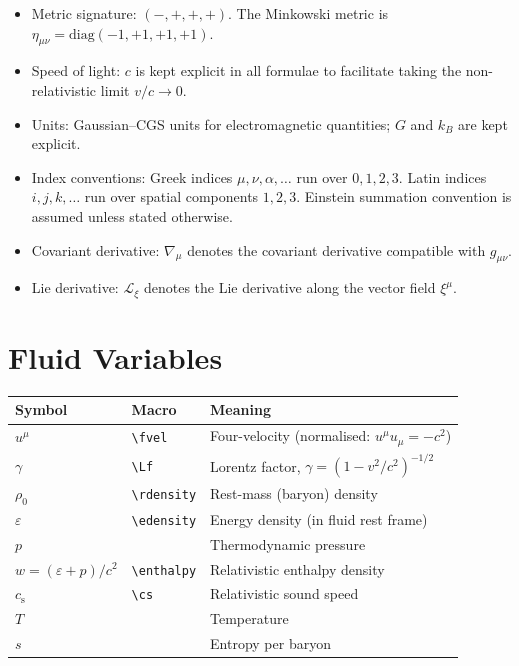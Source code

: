 \documentclass[12pt]{book}
\def\textbf#1{#1}%
\newcommand{\fvel}{u^{\mu}}
\newcommand{\enthalpy}{w}           %
\newcommand{\edensity}{\varepsilon} %
\newcommand{\rdensity}{\rho_0}     %
\newcommand{\Lf}{\gamma}            %
\newcommand{\cs}{c_{\mathrm{s}}}    %
\begin{document}
\begin{itemize}
\item \textbf{Metric signature:} $(-,+,+,+)$.  The Minkowski metric is
  $\eta_{\mu\nu} = \mathrm{diag}(-1,+1,+1,+1)$.
\item \textbf{Speed of light:} $c$ is kept explicit in all formulae to
  facilitate taking the non-relativistic limit $v/c \to 0$.
\item \textbf{Units:} Gaussian--CGS units for electromagnetic quantities;
  $G$ and $k_B$ are kept explicit.
\item \textbf{Index conventions:} Greek indices $\mu, \nu, \alpha, \ldots$
  run over $0,1,2,3$.  Latin indices $i, j, k, \ldots$ run over spatial
  components $1,2,3$.  Einstein summation convention is assumed unless stated
  otherwise.
\item \textbf{Covariant derivative:} $\nabla_\mu$ denotes the covariant
  derivative compatible with $g_{\mu\nu}$.
\item \textbf{Lie derivative:} $\mathcal{L}_\xi$ denotes the Lie derivative
  along the vector field $\xi^\mu$.
\end{itemize}

\section*{Fluid Variables}

\begin{center}
\renewcommand{\arraystretch}{1.25}
\begin{tabular}{@{}lll@{}}
\toprule
\textbf{Symbol} & \textbf{Macro} & \textbf{Meaning} \\
\midrule
$u^\mu$         & \verb|\fvel|       & Four-velocity (normalised: $u^\mu u_\mu = -c^2$) \\
$\gamma$        & \verb|\Lf|         & Lorentz factor, $\gamma = (1 - v^2/c^2)^{-1/2}$ \\
$\rho_0$        & \verb|\rdensity|   & Rest-mass (baryon) density \\
$\varepsilon$   & \verb|\edensity|   & Energy density (in fluid rest frame) \\
$p$             &                    & Thermodynamic pressure \\
$w = (\varepsilon + p)/c^2$ & \verb|\enthalpy| & Relativistic enthalpy density \\
$c_{\mathrm{s}}$ & \verb|\cs|       & Relativistic sound speed \\
$T$             &                    & Temperature \\
$s$             &                    & Entropy per baryon \\
\bottomrule
\end{tabular}
\end{center}
\end{document}
